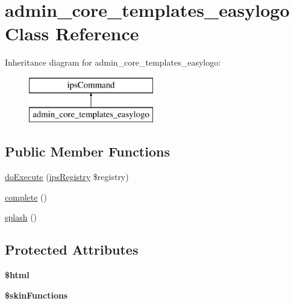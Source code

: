 \hypertarget{classadmin__core__templates__easylogo}{\section{admin\-\_\-core\-\_\-templates\-\_\-easylogo Class Reference}
\label{classadmin__core__templates__easylogo}
}
Inheritance diagram for admin\-\_\-core\-\_\-templates\-\_\-easylogo\-:\begin{figure}[H]
\begin{center}
\leavevmode
\includegraphics[height=2.000000cm]{classadmin__core__templates__easylogo}
\end{center}
\end{figure}
\subsection*{Public Member Functions}
\begin{DoxyCompactItemize}
\item 
\hyperlink{classadmin__core__templates__easylogo_afbc4e912a0604b94d47d66744c64d8ba}{do\-Execute} (\hyperlink{classips_registry}{ips\-Registry} \$registry)
\item 
\hyperlink{classadmin__core__templates__easylogo_a97c73acf76965d89f77bcc5d6d158d22}{complete} ()
\item 
\hyperlink{classadmin__core__templates__easylogo_a183dfa1d4121168eeeb360480a77d773}{splash} ()
\end{DoxyCompactItemize}
\subsection*{Protected Attributes}
\begin{DoxyCompactItemize}
\item 
\hypertarget{classadmin__core__templates__easylogo_a6f96e7fc92441776c9d1cd3386663b40}{{\bfseries \$html}}\label{classadmin__core__templates__easylogo_a6f96e7fc92441776c9d1cd3386663b40}

\item 
\hypertarget{classadmin__core__templates__easylogo_a41d90687021c6f16184b43666509dee8}{{\bfseries \$skin\-Functions}}\label{classadmin__core__templates__easylogo_a41d90687021c6f16184b43666509dee8}

\end{DoxyCompactItemize}
